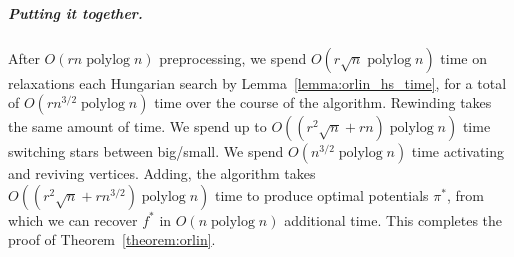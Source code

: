 \documentclass[a4paper,UKenglish]{socg-lipics-v2018}
\def\etal{\emph{et~al.}}
\def\etal{\textit{et~al.}}
\def\polylog{\mathop{\mathrm{polylog}}}
\theoremstyle{plain}
\numberwithin{figure}{section}
\renewcommand{\paragraph}{\subparagraph}
\begin{document}
\paragraph{Putting it together.}
After $O(rn\polylog n)$ preprocessing, we spend $O(r\sqrt{n}\polylog n)$ time
on relaxations each Hungarian search by Lemma~\ref{lemma:orlin_hs_time},
for a total of $O(rn^{3/2}\polylog n)$ time over the course of the algorithm.
Rewinding takes the same amount of time.
We spend up to $O((r^2\sqrt{n} + rn)\polylog n)$ time switching stars between big/small.
We spend $O(n^{3/2}\polylog n)$ time activating and reviving vertices.
Adding, the algorithm takes $O((r^2\sqrt{n} + rn^{3/2})\polylog n)$ time to
produce optimal potentials $\pi^*$, from which we can recover $f^*$ in
$O(n\polylog n)$ additional time.
This completes the proof of Theorem~\ref{theorem:orlin}.






\newpage
\appendix
\end{document}
